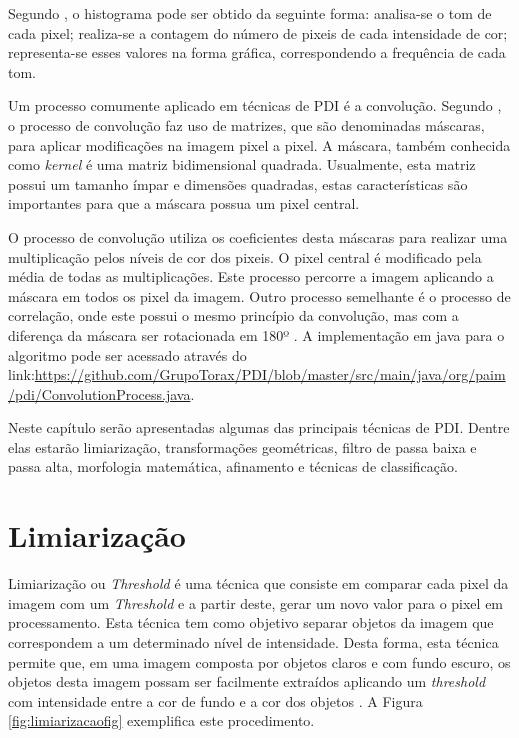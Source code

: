 \documentclass[
	12pt,				%
	oneside,			%
	a4paper,			%
	english,			%
	french,				%
	spanish,			%
	brazil,				%
	]{abntex2}
\begin{document}
Segundo \citet{conciAzevedoLeta:2008}, o histograma pode ser obtido da seguinte forma: analisa-se o tom de cada pixel; realiza-se a contagem do número de pixeis de cada intensidade de cor; representa-se esses valores na forma gráfica, correspondendo a frequência de cada tom.

Um processo comumente aplicado em técnicas de PDI é a convolução. Segundo \citet{pedriniSchwartz:2008}, o processo de convolução faz uso de matrizes, que são denominadas máscaras, para aplicar modificações na imagem pixel a pixel. A máscara, também conhecida como \textit{kernel} é uma matriz bidimensional quadrada. Usualmente, esta matriz possui um tamanho ímpar e dimensões quadradas, estas características são importantes para que a máscara possua um pixel central.

O processo de convolução utiliza os coeficientes desta máscaras para realizar uma multiplicação pelos níveis de cor dos pixeis. O pixel central é modificado pela média de todas as multiplicações. Este processo percorre a imagem aplicando a máscara em todos os pixel da imagem. Outro processo semelhante é o processo de correlação, onde este possui o mesmo princípio da convolução, mas com a diferença da máscara ser rotacionada em 180º \cite{gonzalesWoods:2008}. A implementação em java para o algoritmo pode ser acessado através do link:\url{https://github.com/GrupoTorax/PDI/blob/master/src/main/java/org/paim/pdi/ConvolutionProcess.java}.

Neste capítulo serão apresentadas algumas das principais técnicas de PDI. Dentre elas estarão limiarização, transformações geométricas, filtro de passa baixa e passa alta, morfologia matemática, afinamento e técnicas de classificação.
\section{Limiarização}
\label{sec:limiarizacao}

Limiarização ou \textit{Threshold} é uma técnica que consiste em comparar cada pixel da imagem com um \textit{Threshold} e a partir deste, gerar um novo valor para o pixel em processamento. Esta técnica tem como objetivo separar objetos da imagem que correspondem a um determinado nível de intensidade. Desta forma, esta técnica permite que, em uma imagem composta por objetos claros e com fundo escuro, os objetos desta imagem possam ser facilmente extraídos aplicando um \textit{threshold} com intensidade entre a cor de fundo e a cor dos objetos \cite{gonzalesWoods:2008}. A Figura \ref{fig:limiarizacaofig} exemplifica este procedimento.
\end{document}
